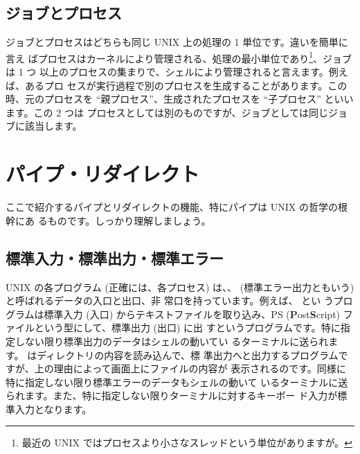 \documentclass[platex]{jsarticle}
\begin{document}
  \subsection{ジョブとプロセス}
  ジョブとプロセスはどちらも同じ UNIX 上の処理の 1 単位です。違いを簡単に言え
  ばプロセスはカーネルにより管理される、処理の最小単位であり\footnote{ 最近の
  UNIX ではプロセスより小さなスレッドという単位がありますが。}、ジョブは 1 つ
  以上のプロセスの集まりで、シェルにより管理されると言えます。例えば、あるプロ
  セスが実行過程で別のプロセスを生成することがあります。この時、元のプロセスを
  ``親プロセス''、生成されたプロセスを ``子プロセス'' といいます。この 2 つは
  プロセスとしては別のものですが、ジョブとしては同じジョブに該当します。



%



\section{パイプ・リダイレクト}

 ここで紹介するパイプとリダイレクトの機能、特にパイプは UNIX の哲学の根幹にあ
 るものです。しっかり理解しましょう。


 \subsection{標準入力・標準出力・標準エラー}
 UNIX の各プログラム (正確には、各プロセス) は、、
  (標準エラー出力ともいう) と呼ばれるデータの入口と出口、非
 常口を持っています。例えば、 %
  とい
 うプログラムは標準入力 (入口) からテキストファイルを取り込み、PS
 (\textbf{P}ost\textbf{S}cript) ファイルという型にして、標準出力 (出口) に出
 すというプログラムです。特に指定しない限り標準出力のデータはシェルの動いてい
 るターミナルに送られます。  はディレクトリの内容を読み込んで、標
 準出力へと出力するプログラムですが、上の理由によって画面上にファイルの内容が
 表示されるのです。同様に特に指定しない限り標準エラーのデータもシェルの動いて
 いるターミナルに送られます。また、特に指定しない限りターミナルに対するキーボー
 ド入力が標準入力となります。


 \ifColorOutput
 \else
 \fi
\end{document}
